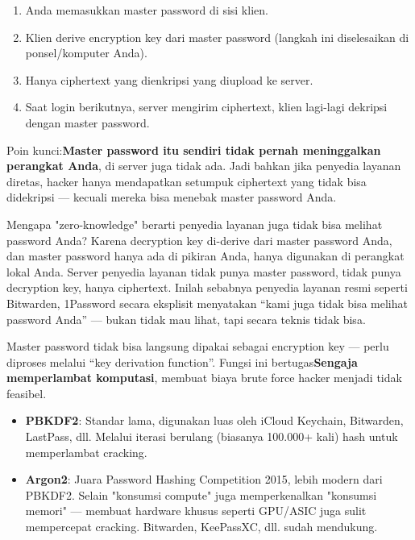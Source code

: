 \begin{enumerate}
  \item Anda memasukkan master password di sisi klien.
  \item Klien derive encryption key dari master password (langkah ini diselesaikan di ponsel/komputer Anda).
  \item Hanya ciphertext yang dienkripsi yang diupload ke server.
  \item Saat login berikutnya, server mengirim ciphertext, klien lagi-lagi dekripsi dengan master password.
\end{enumerate}

Poin kunci:\textbf{Master password itu sendiri tidak pernah meninggalkan perangkat Anda}, di server juga tidak ada. Jadi bahkan jika penyedia layanan diretas, hacker hanya mendapatkan setumpuk ciphertext yang tidak bisa didekripsi — kecuali mereka bisa menebak master password Anda.

\begin{tcbinfo}{Mengapa "zero-knowledge" berarti penyedia layanan juga tidak bisa melihat password Anda?}
Karena decryption key di-derive dari master password Anda, dan master password hanya ada di pikiran Anda, hanya digunakan di perangkat lokal Anda. Server penyedia layanan tidak punya master password, tidak punya decryption key, hanya ciphertext. Inilah sebabnya penyedia layanan resmi seperti Bitwarden, 1Password secara eksplisit menyatakan “kami juga tidak bisa melihat password Anda” — bukan tidak mau lihat, tapi secara teknis tidak bisa.

\end{tcbinfo}


Master password tidak bisa langsung dipakai sebagai encryption key — perlu diproses melalui “key derivation function”. Fungsi ini bertugas\textbf{Sengaja memperlambat komputasi}, membuat biaya brute force hacker menjadi tidak feasibel.

\begin{itemize}
  \item \textbf{PBKDF2}: Standar lama, digunakan luas oleh iCloud Keychain, Bitwarden, LastPass, dll. Melalui iterasi berulang (biasanya 100.000+ kali) hash untuk memperlambat cracking.
  \item \textbf{Argon2}: Juara Password Hashing Competition 2015, lebih modern dari PBKDF2. Selain "konsumsi compute" juga memperkenalkan "konsumsi memori" — membuat hardware khusus seperti GPU/ASIC juga sulit mempercepat cracking. Bitwarden, KeePassXC, dll. sudah mendukung.
\end{itemize}

